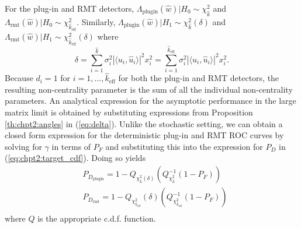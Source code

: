For the plug-in and RMT detectors, $\Lambda_\text{plugin}(\widehat{w})|H_0\sim\chi_{\widehat{k}}^2$ and $\Lambda_\text{rmt}(\widehat{w})|H_0\sim\chi_{\widehat{k}_{\text{eff}}}^2$. Similarly, $\Lambda_\text{plugin}(\widehat{w})|H_1\sim\chi_{\widehat{k}}^2(\delta)$ and $\Lambda_\text{rmt}(\widehat{w})|H_1\sim\chi_{\widehat{k}_{\text{eff}}}^2(\delta)$ where
\begin{equation}\label{eq:delta}
\delta=\sum_{i=1}^{\widehat{k}}\sigma_i^2|\langle u_i,\widehat{u}_i\rangle|^2x_i^2=\sum_{i=1}^{\widehat{k}_{\text{eff}}}\sigma_i^2|\langle u_i,\widehat{u}_i\rangle|^2x_i^2.
 \end{equation}
Because $d_i=1$ for $i=1,\dots,\widehat{k}_{\text{eff}}$ for both the plug-in and RMT detectors, the resulting non-centrality parameter is the sum of all the individual non-centrality parameters. An analytical expression for the asymptotic performance in the large matrix limit  is obtained by substituting expressions from Proposition \ref{th:chpt2:angles} in (\ref{eq:delta}). Unlike the stochastic setting, we can obtain a closed form expression for the deterministic plug-in and RMT ROC curves by solving for $\gamma$ in terms of $P_F$ and substituting this into the expression for $P_D$  in (\ref{eq:chpt2:target_cdf}). Doing so yields
\small\begin{equation}\label{eq:roc}
\begin{aligned}
&P_{D_\text{plugin}}=1-Q_{\chi_{\widehat{k}}^2(\delta)}\left(Q^{-1}_{\chi^2_{\widehat{k}}}\left(1-P_F\right)\right)\\
&P_{D_\text{rmt}}=1-Q_{\chi_{\widehat{k}_{\text{eff}}}^2}(\delta)\left(Q^{-1}_{\chi^2_{\widehat{k}_{\text{eff}}}}\left(1-P_F\right)\right)\\
\end{aligned}
\end{equation}\normalsize
where $Q$ is the appropriate c.d.f. function.
